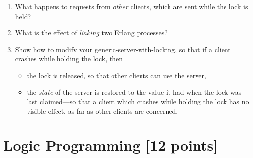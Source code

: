 \documentclass{article}
\begin{document}
\begin{enumerate}
\item
What happens to requests from {\em other} clients, which are sent
while the lock is held?

\item
What is the effect of {\em linking} two Erlang processes?

\item
Show how to modify your generic-server-with-locking, so that if a client
crashes while holding the lock, then
\begin{itemize}
\item the lock is released, so that other clients can use the server,
\item the {\em state} of the server is restored to the value it had
  when the lock was last claimed---so that a client which crashes
  while holding the lock has no visible effect, as far as other
  clients are concerned.
\end{itemize}

\end{enumerate}

\newpage
\section{Logic Programming [12 points]}
\end{document}
